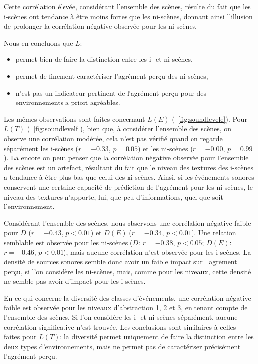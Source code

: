 Cette corrélation élevée, considérant l'ensemble des scènes, résulte du fait que les i-scènes ont tendance à être moins fortes que les ni-scènes, donnant ainsi l'illusion de prolonger la corrélation négative observée pour les ni-scènes.  

Nous en concluons que $L$:

\begin{itemize}
\item permet bien de faire la distinction entre les i- et ni-scènes,
\item permet de finement caractériser l'agrément perçu des ni-scènes,
\item n'est pas un indicateur pertinent de l'agrément perçu pour des environnements a priori agréables.
\end{itemize}

Les mêmes observations sont faites concernant $L(E)$ (\cf~\ref{fig:soundlevele}). Pour $L(T)$ (\cf~\ref{fig:soundlevelf}), bien que, à considérer l'ensemble des scènes, on observe une corrélation modérée, cela n'est pas vérifié quand on regarde séparément les i-scènes ($r=-0.33$, $p=0.05$) et les ni-scènes ($r=-0.00$, $p=0.99$). Là encore on peut penser que la corrélation négative observée pour l'ensemble des scènes est un artefact, résultant du fait que le niveau des textures des i-scènes a tendance à être plus bas que celui des ni-scènes. Ainsi, si les événements sonores conservent une certaine capacité de prédiction de l'agrément pour les ni-scènes, le niveau des textures n'apporte, lui, que peu d'informations, quel que soit l'environnement.

Considérant l'ensemble des scènes, nous observons une corrélation négative faible pour $D$ ($r=-0.43$, $p<0.01$) et $D(E)$ ($r=-0.34$, $p<0.01$). Une relation semblable est observée pour les ni-scènes ($D$: $r=-0.38$, $p<0.05$; $D(E)$: $r=-0.46$, $p<0.01$), mais aucune corrélation n'est observée pour les i-scènes. La densité de sources sonores semble donc avoir un faible impact sur l'agrément perçu, si l'on considère les ni-scènes, mais, comme pour les niveaux, cette densité ne semble pas avoir d'impact pour les i-scènes.

En ce qui concerne la diversité des classes d'événements, une corrélation négative faible est observée pour les niveaux d'abstraction 1, 2 et 3, en tenant compte de l'ensemble des scènes. Si l'on considère les i- et ni-scènes séparément, aucune corrélation significative n'est trouvée. Les conclusions sont similaires à celles faites pour $L(T)$: la diversité permet uniquement de faire la distinction entre les deux types d'environnements, mais ne permet pas de caractériser précisément l'agrément perçu.

